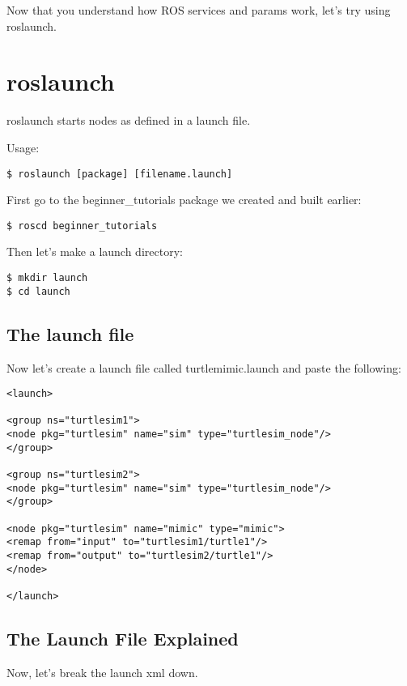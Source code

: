 Now that you understand how ROS services and params work, let's try using roslaunch.

\section{roslaunch}
roslaunch starts nodes as defined in a launch file.

Usage:
\begin{lstlisting}[breaklines=true languages=bash]
$ roslaunch [package] [filename.launch]
\end{lstlisting}

First go to the beginner\_tutorials package we created and built earlier:

\begin{lstlisting}[breaklines=true languages=bash]
$ roscd beginner_tutorials
\end{lstlisting}

Then let's make a launch directory:

\begin{lstlisting}[breaklines=true languages=bash]
$ mkdir launch
$ cd launch
\end{lstlisting}

\subsection{The launch file}

Now let's create a launch file called turtlemimic.launch and paste the following:

\begin{lstlisting}[breaklines=true languages=bash]
<launch>

<group ns="turtlesim1">
<node pkg="turtlesim" name="sim" type="turtlesim_node"/>
</group>

<group ns="turtlesim2">
<node pkg="turtlesim" name="sim" type="turtlesim_node"/>
</group>

<node pkg="turtlesim" name="mimic" type="mimic">
<remap from="input" to="turtlesim1/turtle1"/>
<remap from="output" to="turtlesim2/turtle1"/>
</node>

</launch>
\end{lstlisting}

\subsection{The Launch File Explained}

Now, let's break the launch xml down.

